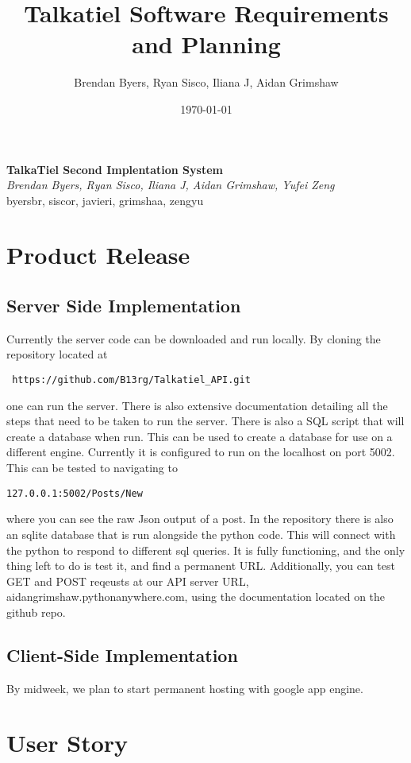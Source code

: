 \documentclass[12pt]{article}
\title{Talkatiel Software Requirements and Planning}
\author{Brendan Byers, Ryan Sisco, Iliana J, Aidan Grimshaw}
\date{\today}
\begin{document}
\begin{center}
 \Large\textbf{TalkaTiel Second Implentation System}\\
 \large\textit{Brendan Byers, Ryan Sisco, Iliana J, Aidan Grimshaw, Yufei Zeng}\\
 \large{byersbr, siscor, javieri, grimshaa, zengyu}\\
\end{center}

\tableofcontents
\section{Product Release} \subsection{Server Side Implementation} Currently the
server code can be downloaded and run locally.  By cloning the repository
located at\begin{verbatim} https://github.com/B13rg/Talkatiel_API.git
\end{verbatim}one can run the server.  There is also extensive documentation
detailing all the steps that need to be taken to run the server.  There is also
a SQL script that will create a database when run.  This can be used to create a
database for use on a different engine.  Currently it is configured to run on
the localhost on port 5002.  This can be tested to navigating to
\begin{verbatim}127.0.0.1:5002/Posts/New \end{verbatim}where you can see the raw
Json output of a post.  In the repository there is also an sqlite database that
is run alongside the python code.  This will connect with the python to respond
to different sql queries.  It is fully functioning, and the only thing left to
do is test it, and find a permanent URL. Additionally, you can test GET and POST
reqeusts at our API server URL, aidangrimshaw.pythonanywhere.com, using the
documentation located on the github repo.

\subsection{Client-Side Implementation}
By midweek, we plan to start permanent
hosting with google app engine.

\section{User Story}
\end{document}
